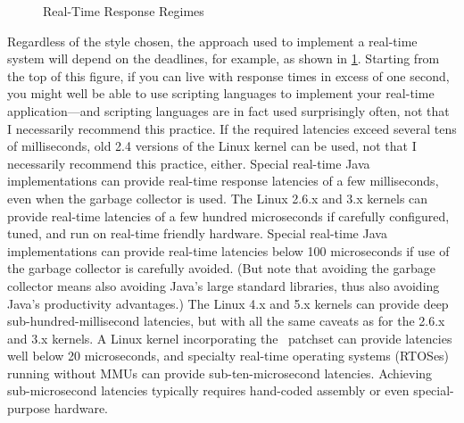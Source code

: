 \begin{figure}[tb]
\centering
{}
\caption{Real-Time Response Regimes}
\label{fig:advsync:Real-Time Response Regimes}
\end{figure}

Regardless of the style chosen, the approach used to implement a real-time
system will depend on the deadlines, for example, as shown in
\cref{fig:advsync:Real-Time Response Regimes}.
Starting from the top of this figure, if you can live with response times in
excess of one second, you might well be able to use scripting languages
to implement your real-time application---and scripting languages are
in fact used surprisingly often, not that I necessarily recommend this
practice.
If the required latencies exceed several tens of milliseconds,
old 2.4 versions of the Linux kernel can be used, not that I necessarily
recommend this practice, either.
Special real-time Java implementations can provide real-time response
latencies of a few milliseconds, even when the garbage collector is
used.
The Linux 2.6.x and 3.x kernels can provide real-time latencies of
a few hundred microseconds if carefully configured, tuned, and run
on real-time friendly hardware.
Special real-time Java implementations can provide real-time latencies
below 100 microseconds if use of the garbage collector is carefully avoided.
(But note that avoiding the garbage collector means also avoiding
Java's large standard libraries, thus also avoiding Java's productivity
advantages.)
The Linux 4.x and 5.x kernels can provide deep sub-hundred-millisecond
latencies, but with all the same caveats as for the 2.6.x and 3.x kernels.
A Linux kernel incorporating the \rt\ patchset can provide latencies
well below 20 microseconds, and specialty real-time operating systems (RTOSes)
running without MMUs can provide sub-ten-microsecond
latencies.
Achieving sub-microsecond latencies typically requires hand-coded assembly
or even special-purpose hardware.


